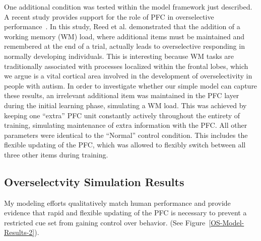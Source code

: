 One additional condition was tested within the model framework just described.  A recent study provides support for the role of PFC in overselective performance~\cite{ReedP:2005:TaskLoad}.  In this study, Reed et al. demonstrated that the addition of a working memory (WM) load, where additional items must be maintained and remembered at the end of a trial, actually leads to overselective responding in normally developing individuals.  This is interesting because WM tasks are traditionally associated with processes localized within the frontal lobes, which we argue is a vital cortical area involved in the development of overselectivity in people with autism.  In order to investigate whether our simple model can capture these results, an irrelevant additional item was maintained in the PFC layer during the initial learning phase, simulating a WM load.  This was achieved by keeping one ``extra'' PFC unit constantly actively throughout the entirety of training, simulating maintenance of extra information with the PFC.  All other parameters were identical to the ``Normal'' control condition.  This includes the flexible updating of the PFC, which  was allowed to flexibly switch between all three other items during training.

\subsection{Overselectvity Simulation Results}
My modeling efforts qualitatively match human performance and provide evidence that rapid and flexible updating of the PFC is necessary to prevent a restricted cue set from gaining control over behavior. (See Figure~\ref{OS-Model-Results-2}).  

